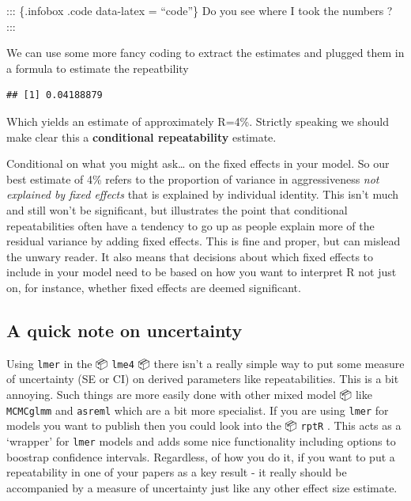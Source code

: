 \documentclass[
  12pt,
]{book}
\newenvironment{Shaded}{\begin{snugshade}}{\end{snugshade}}
\newcommand{\DecValTok}[1]{\textcolor[rgb]{0.00,0.00,0.81}{#1}}
\newcommand{\KeywordTok}[1]{\textcolor[rgb]{0.13,0.29,0.53}{\textbf{#1}}}
\newcommand{\NormalTok}[1]{#1}
\newcommand{\OperatorTok}[1]{\textcolor[rgb]{0.81,0.36,0.00}{\textbf{#1}}}
\newcommand{\StringTok}[1]{\textcolor[rgb]{0.31,0.60,0.02}{#1}}
\begin{document}
::: \{.infobox .code data-latex = ``code''\}
Do you see where I took the numbers ?
:::

We can use some more fancy coding to extract the estimates and plugged them in a formula to estimate the repeatbility

\begin{Shaded}
\end{Shaded}

\begin{verbatim}
## [1] 0.04188879
\end{verbatim}

Which yields an estimate of approximately R=4\%. Strictly speaking we should make clear this a \textbf{conditional repeatability} estimate.

Conditional on what you might ask\ldots{} on the fixed effects in your model. So our best estimate of 4\% refers to the proportion of variance in aggressiveness \emph{not explained by fixed effects} that is explained by individual identity. This isn't much and still won't be significant, but illustrates the point that conditional repeatabilities often have a tendency to go up as people explain more of the residual variance by adding fixed effects. This is fine and proper, but can mislead the unwary reader.
It also means that decisions about which fixed effects to include in your model need to be based on how you want to interpret R not just on, for instance, whether fixed effects are deemed significant.

\hypertarget{a-quick-note-on-uncertainty}{%
\subsection{A quick note on uncertainty}\label{a-quick-note-on-uncertainty}}

Using \texttt{lmer} in the 📦 \texttt{lme4} 📦 there isn't a really simple way to put some measure of uncertainty (SE or CI) on derived parameters like repeatabilities. This is a bit annoying. Such things are more easily done with other mixed model 📦 like \texttt{MCMCglmm} and \texttt{asreml} which are a bit more specialist. If you are using \texttt{lmer} for models you want to publish then you could look into the 📦 \texttt{rptR} \citep{R-rptR}. This acts as a `wrapper' for \texttt{lmer} models and adds some nice functionality including options to boostrap confidence intervals. Regardless, of how you do it, if you want to put a repeatability in one of your papers as a key result - it really should be accompanied by a measure of uncertainty just like any other effect size estimate.
\end{document}
